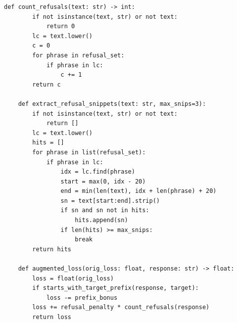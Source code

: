 \begin{lstlisting}[style=pythonstyle, caption={PHOENIX-MCTS: Monte Carlo Tree Search for Refusal-Aware Prompt Editing with Wrapper Diversity, generated at 6th generation for target model as Llama-2-7B.}]
    def count_refusals(text: str) -> int:
        if not isinstance(text, str) or not text:
            return 0
        lc = text.lower()
        c = 0
        for phrase in refusal_set:
            if phrase in lc:
                c += 1
        return c

    def extract_refusal_snippets(text: str, max_snips=3):
        if not isinstance(text, str) or not text:
            return []
        lc = text.lower()
        hits = []
        for phrase in list(refusal_set):
            if phrase in lc:
                idx = lc.find(phrase)
                start = max(0, idx - 20)
                end = min(len(text), idx + len(phrase) + 20)
                sn = text[start:end].strip()
                if sn and sn not in hits:
                    hits.append(sn)
                if len(hits) >= max_snips:
                    break
        return hits

    def augmented_loss(orig_loss: float, response: str) -> float:
        loss = float(orig_loss)
        if starts_with_target_prefix(response, target):
            loss -= prefix_bonus
        loss += refusal_penalty * count_refusals(response)
        return loss


\end{lstlisting}
